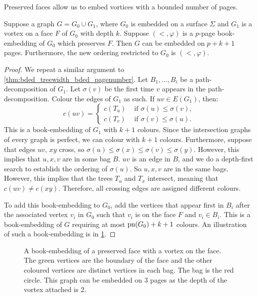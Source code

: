 Preserved faces allow us to embed vortices with a bounded number of pages. 

\begin{lemma}\label{lem:preserved_faces_pagenumber}
	Suppose a graph \(G = G_0 \cup G_1\), where \(G_0\) is embedded on a surface $\Sigma$ and \(G_1\) is a vortex on a face $F$ of $G_0$ with depth \(k\). Suppose $(<, \varphi)$ is a $p$-page book-embedding of \(G_0\) which preserves \(F\). Then $G$ can be embedded on \(p + k + 1\) pages. Furthermore, the new ordering restricted to $G_0$ is $(<, \varphi)$.
\end{lemma}

\begin{proof}
	We repeat a similar argument to \cref{thm:bded_treewidth_bded_pagenumber}. Let \(B_1, \ldots, B_i\) be a path-decomposition of \(G_1\). Let \(\sigma(v)\) be the first time \(v\) appears in the path-decomposition. Colour the edges of \(G_1\) as such. If \(uv \in E(G_1)\), then:
	\begin{equation}
		c(uv) =
		\begin{cases}
			c(T_u) & \text{ if } \sigma(u) \leq \sigma(v), \\
			c(T_v) & \text{ if } \sigma(v) \leq \sigma(u).
		\end{cases}
	\end{equation}
	This is a book-embedding of \(G_1\) with \(k+1\) colours. Since the intersection graphs of every graph is perfect, we can colour with $k + 1$ colours. Furthermore, suppose that edges \(uv\), \(xy\) cross, so \(\sigma(u) \leq \sigma(x) \leq \sigma(v) \leq \sigma(y)\). However, this implies that $u,x,v$ are in some bag $B$. \(uv\) is an edge in \(B\), and we do a depth-first search to establish the ordering of $\sigma(u)$. So \(u, x, v\) are in the same bags. However, this implies that the trees \(T_u\) and \(T_x\) intersect, meaning that \(c(uv) \neq c(xy)\). Therefore, all crossing edges are assigned different colours. 

	To add this book-embedding to \(G_0\), add the vertices that appear first in \(B_i\) after the associated vertex \(v_i\) in \(G_0\) such that \(v_i\) is on the face \(F\) and \(v_i \in B_i\). This is a book-embedding of \(G\) requiring at most \(\operatorname{pn}(G_0) + k + 1\) colours. An illustration of such a book-embedding is in \cref{fig:preserved_face}.
\end{proof}

\begin{figure}[h!]
	\centering
	
	\caption[Book-embedding of a preserved face]{A book-embedding of a preserved face  with a vortex on the face. The green vertices are the boundary of the face and the other coloured vertices are distinct vertices in each bag. The bag is the red circle. This graph can be embedded on $3$ pages as the depth of the vortex attached is 2. }\label{fig:preserved_face}
\end{figure}

